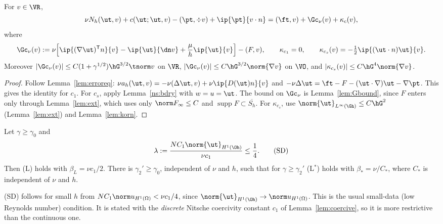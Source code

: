 \begin{lemma}\label{ns:erreq}
For $v\in\VR$,
\[
\nu N_h(\ut,v)+c(\ut;\ut,v)-(\pt,\div v)+\ip{\pt}{v\cdot n}=(\ft,v)+\Gc_\nu(v)+\kappa_c(v),
\]
where
\[
\Gc_\nu(v):=\nu\Bigl[\ip{(\nabla\ut)^{\mathsf T}n}{v}-\ip{\ut}{\dn v}+\frac\mu h\ip{\ut}{v}\Bigr]-(F,v),
\qquad \kappa_{c_1}=0,\qquad \kappa_{c_s}(v)=-\tfrac12\ip{(\ut\cdot n)\ut}{v}.
\]
Moreover $|\Gc_\nu(v)|\le C(1+\gamma^{1/2})\hG^{3/2}\tnorm v$ on $\VR$, $|\Gc_\nu(v)|\le C\hG^{3/2}\norm{\nabla v}$ on $\VO$, and $|\kappa_{c_s}(v)|\le C\hG^4\norm{\nabla v}$.
\end{lemma}

\begin{proof}
Follow Lemma~\ref{lem:erroreq}: $\nu a_h(\ut,v)=-\nu(\Delta\ut,v)+\nu\ip{D(\ut)n}{v}$ and $-\nu\Delta\ut=\ft-F-(\ut\cdot\nabla)\ut-\nabla\pt$. This gives the identity for $c_1$. For $c_s$, apply Lemma~\ref{ns:bdry} with $w=u=\ut$. The bound on $\Gc_\nu$ is Lemma~\ref{lem:Gbound}, since $F$ enters only through Lemma~\ref{lem:ext}, which uses only $\norm F_\infty\le C$ and $\operatorname{supp}F\subset\overline{S_h}$. For $\kappa_{c_s}$, use $\norm{\ut}_{L^\infty(\Gh)}\le C\hG^2$ (Lemma~\ref{lem:ext}) and Lemma~\ref{lem:korn}.
\end{proof}

\begin{lemma}\label{ns:SD}
Let $\gamma\ge\gamma_0$ and
\[
\lambda:=\frac{N C_1\norm{\ut}_{H^1(\Oh)}}{\nu c_1}\le\frac14 .\tag{SD}
\]
Then (L) holds with $\beta_L=\nu c_1/2$. There is $\gamma_2'\ge\gamma_0$, independent of $\nu$ and $h$, such that for $\gamma\ge\gamma_2'$ (L$^\ast$) holds with $\beta_\ast=\nu/C_\ast$, where $C_\ast$ is independent of $\nu$ and $h$.
\end{lemma}

(SD) follows for small $h$ from $NC_1\norm u_{H^1(\Omega)}<\nu c_1/4$, since $\norm{\ut}_{H^1(\Oh)}\to\norm u_{H^1(\Omega)}$. This is the usual small-data (low Reynolds number) condition. It is stated with the \emph{discrete} Nitsche coercivity constant $c_1$ of Lemma~\ref{lem:coercive}, so it is more restrictive than the continuous one.

